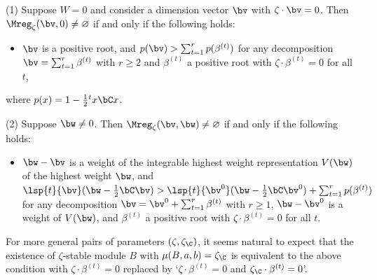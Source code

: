 \begin{Theorem}\label{thm:CB}
  \textup{(1)} Suppose $W = 0$ and consider a dimension vector $\bv$
  with $\zeta\cdot \bv = 0$. Then $\Mreg_\zeta(\bv,0)\neq\varnothing$ if
  and only if the following holds\textup:
\begin{itemize}\itemsep=0pt
\item $\bv$ is a positive root, and $p(\bv) > \sum_{t=1}^r
  p(\beta^{(t)})$ for any decomposition $\bv = \sum_{t=1}^r
  \beta^{(t)}$ with $r \ge 2$ and $\beta^{(t)}$ a positive root with
  $\zeta\cdot \beta^{(t)} = 0$ for all $t$,
\end{itemize}
where $p(x) = 1 - \frac12 {}^t x \bC x$.

\textup{(2)} Suppose $\bw\neq 0$. Then
$\Mreg_\zeta(\bv,\bw)\neq\varnothing$ if and only if the following
holds:
\begin{itemize}\itemsep=0pt
\item $\bw - \bv$ is a weight of the integrable highest weight
  representation $V(\bw)$ of the highest weight $\bw$, and
  $\lsp{t}{\bv}(\bw - \frac12 \bC \bv) > \lsp{t}{\bv^0}(\bw - \frac12
  \bC \bv^0) + \sum_{t=1}^r p(\beta^{(t)})$ for any decomposition $\bv
  = \bv^0 + \sum_{t=1}^r \beta^{(t)}$ with $r \ge 1$, $\bw - \bv^0$ is
  a weight of $V(\bw)$, and $\beta^{(t)}$ a positive root with
  $\zeta\cdot \beta^{(t)} = 0$ for all $t$.
\end{itemize}
\end{Theorem}

\begin{Remark}
For more general pairs of parameters $(\zeta,\zeta_\C)$, it seems
natural to expect that the existence of $\zeta$-stable module $B$
with $\mu(B,a,b) = \zeta_\C$ is equivalent to the above condition with
$\zeta\cdot \beta^{(t)} = 0$ replaced by
`$\zeta\cdot \beta^{(t)} = 0$ and $\zeta_\C\cdot\beta^{(t)} = 0$'.
\end{Remark}

